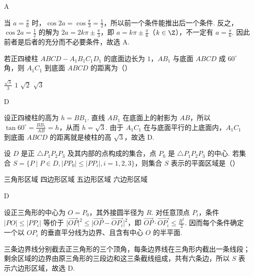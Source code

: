 \begin{answer}
A
\end{answer}

\begin{solution}
当 \(a=\frac{\pi}{6}\) 时，\(\cos2a=\cos\frac{\pi}{3}=\frac{1}{2}\)，所以前一个条件能推出后一个条件. 反之，\(\cos2a=\frac{1}{2}\) 的解为 \(2a=2k\pi\pm\frac{\pi}{3}\)，即 \(a=k\pi\pm\frac{\pi}{6}\)（\(k\in\Z\)），不一定有 \(a=\frac{\pi}{6}\). 因此前者是后者的充分而不必要条件，故选 A.
\end{solution}

\begin{problem}
若正四棱柱 \(ABCD - A_{1}B_{1}C_{1}D_{1}\) 的底面边长为 \(1\)，\(AB_{1}\) 与底面 \(ABCD\) 成 \(60^{\circ}\) 角，则 \(A_{1}C_{1}\) 到底面 \(ABCD\) 的距离为（\quad）

\choices
    {\(\frac{\sqrt{3}}{3}\)}
    {\(1\)}
    {\(\sqrt{2}\)}
    {\(\sqrt{3}\)}
\end{problem}

\begin{answer}
D
\end{answer}

\begin{solution}
设正四棱柱的高为 \(h=BB_1\). 直线 \(AB_1\) 在底面上的射影为 \(AB\)，所以 \(\tan60^{\circ}=\frac{BB_1}{AB}=h\)，从而 \(h=\sqrt{3}\). 由于 \(A_1C_1\) 在与底面平行的上底面内，\(A_1C_1\) 到底面 \(ABCD\) 的距离就是棱柱的高 \(\sqrt{3}\)，故选 D.
\end{solution}

\begin{problem}
设 \(D\) 是正 \(\triangle P_{1}P_{2}P_{3}\) 及其内部的点构成的集合，点 \(P_{0}\) 是 \(\triangle P_{1}P_{2}P_{3}\) 的中心. 若集合 \(S = \{P \mid P \in D, |PP_{0}| \leqslant |PP_{i}|, i = 1, 2, 3\}\)，则集合 \(S\) 表示的平面区域是（\quad）

\choices
    {三角形区域}
    {四边形区域}
    {五边形区域}
    {六边形区域}
\end{problem}

\begin{answer}
D
\end{answer}

\begin{solution}
设正三角形的中心为 \(O=P_0\)，其外接圆半径为 \(R\). 对任意顶点 \(P_i\)，条件 \(\lvert PO\rvert\leqslant\lvert PP_i\rvert\) 等价于 \(\lvert\overrightarrow{OP}\rvert^2\leqslant\lvert\overrightarrow{OP}-\overrightarrow{OP_i}\rvert^2\)，即 \(\overrightarrow{OP}\mathbin{\cdot}\overrightarrow{OP_i}\leqslant\frac{R^2}{2}\). 因而每个条件确定一个以 \(OP_i\) 的垂直平分线为边界、且含有中心 \(O\) 的半平面.

三条边界线分别截去正三角形的三个顶角，每条边界线在三角形内截出一条线段；剩余区域的边界由原三角形的三段边和这三条截线组成，共有六条边，所以 \(S\) 表示六边形区域，故选 D.
\end{solution}

